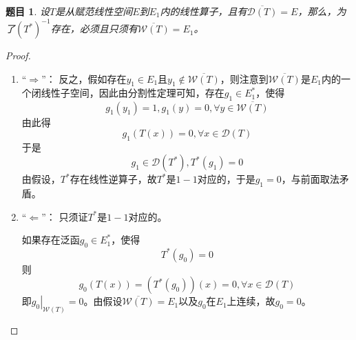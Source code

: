 \documentclass[winfonts,UTF8,c5size,a4paper,fancyhdr,hyperref,titlepage,nocap]{ctexart}
\theoremstyle{question}
\newtheorem{Qut}{题目}
\theoremstyle{theorem}
\theoremstyle{definition}
\theoremstyle{remark}
\numberwithin{equation}{subsection}
\newcommand{\local}[2]{\left.{#1}\right|_{#2}}%
\begin{document}
\begin{Qut}
设$T$是从赋范线性空间$E$到$E_1$内的线性算子，且有$\overline{\mathcal{D}(T)}=E$，那么，为了$(T^{\ast})^{-1}$存在，必须且只须有$\overline{\mathcal{W}(T)}=E_1$。
\end{Qut}
\begin{proof}
\begin{enumerate}[1)]
    \setlength{\itemindent}{2ex}
    \item ``$\Longrightarrow$''：
    反之，假如存在$y_1\in E_1$且$y_1\notin\overline{\mathcal{W}(T)}$，则注意到$\overline{\mathcal{W}(T)}$是$E_1$内的一个闭线性子空间，因此由分割性定理可知，存在$g_1\in E_1^{\ast}$，使得
    \begin{equation*}
    g_1(y_1)=1, g_1(y)=0, \forall y\in\overline{\mathcal{W}(T)}
    \end{equation*}
    由此得
    \begin{equation*}
    g_1(T(x))=0,\forall x\in\mathcal{D}(T)
    \end{equation*}
    于是
    \begin{equation*}
    g_1\in\mathcal{D}(T^{\ast}), T^{\ast}(g_1)=0
    \end{equation*}
    由假设，$T^{\ast}$存在线性逆算子，故$T^{\ast}$是$1-1$对应的，于是$g_1=0$，与前面取法矛盾。
    \item ``$\Longleftarrow$''：
    只须证$T^{\ast}$是$1-1$对应的。

    如果存在泛函$g_0\in E_1^{\ast}$，使得
    \begin{equation*}
    T^{\ast}(g_0)=0
    \end{equation*}
    则
    \begin{equation*}
    g_0(T(x))=(T^{\ast}(g_0))(x)=0, \forall x\in\mathcal{D}(T)
    \end{equation*}
    即$\local{g_0}{\mathcal{W}(T)}=0$。由假设$\overline{\mathcal{W}(T)}=E_1$以及$g_0$在$E_1$上连续，故$g_0=0$。
\end{enumerate}
\end{proof}
\end{document}
